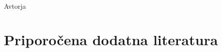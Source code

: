 \documentclass[11pt,fleqn]{book} %
\begin{document}
% 

\vspace{1em}

Avtorja





\chapter*{Priporočena dodatna literatura}
\end{document}
